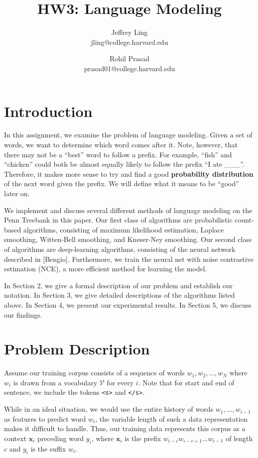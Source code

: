 \documentclass[11pt]{article}
\title{HW3: Language Modeling}
\author{Jeffrey Ling \\ jling@college.harvard.edu \and Rohil Prasad \\ prasad01@college.harvard.edu }
\begin{document}
\maketitle{}
\section{Introduction}

In this assignment, we examine the problem of language modeling. Given a set of words, we want to determine which word comes after it. Note, however, that there may not be a ``best'' word to follow a prefix. For example, ``fish'' and ``chicken'' could both be almost equally likely to follow the prefix ``I ate \_\_\_''. Therefore, it makes more sense to try and find a good \textbf{probability distribution} of the next word given the prefix. We will define what it means to be ``good'' later on. 

We implement and discuss several different methods of language modeling on the Penn Treebank in this paper. Our first class of algorithms are probabilistic count-based algorithms, consisting of maximum likelihood estimation, Laplace smoothing, Witten-Bell smoothing, and Kneser-Ney smoothing. Our second class of algorithms are deep-learning algorithms, consisting of the neural network described in [Bengio]. Furthermore, we train the neural net with noise contrastive estimation (NCE), a more efficient method for learning the model.

In Section 2, we give a formal description of our problem and establish our notation. In Section 3, we give detailed descriptions of the algorithms listed above. In Section 4, we present our experimental results. In Section 5, we discuss our findings. 

\section{Problem Description}

Assume our training corpus consists of a sequence of words $w_1, w_2, \dots, w_N$ where $w_i$ is drawn from a vocabulary $\mathcal{V}$ for every $i$. Note that for start and end of sentence, we include the tokens \texttt{<s>} and \texttt{</s>}.

While in an ideal situation, we would use the entire history of words $w_1, \ldots, w_{i-1}$ as features to predict word $w_i$, the variable length of such a data representation makes it difficult to handle. Thus, our training data represents this corpus as a context $\mathbf{x}_i$ preceding word $y_i$, where $\mathbf{x}_i$ is the prefix $w_{i-c}w_{i-c+1}\dots w_{i-1}$ of length $c$ and $y_i$ is the suffix $w_i$. 
\end{document}
